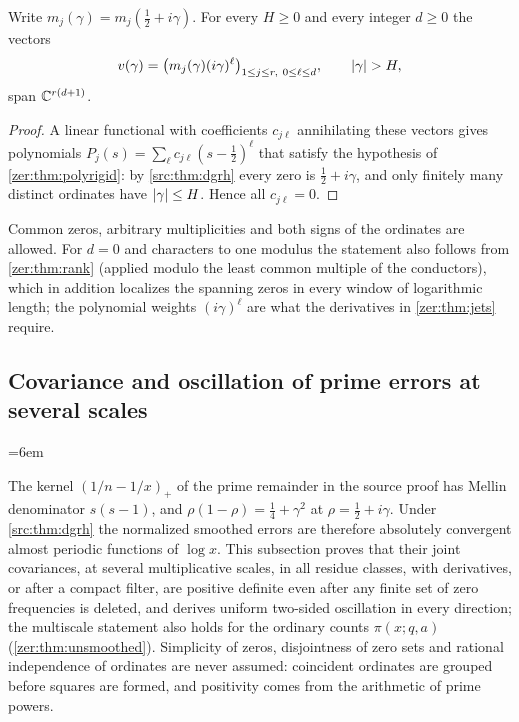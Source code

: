 \begin{corollary}\label{zer:cor:tail}
Write $m_j(\gamma)=m_j(\tfrac12+i\gamma)$. For every $H\ge0$ and every integer $d\ge0$ the
vectors
\[
 v(\gamma)=\bigl(m_j(\gamma)(i\gamma)^\ell\bigr)_{1\le j\le r,\ 0\le\ell\le d},\qquad
 \lvert\gamma\rvert>H,
\]
span $\mathbb{C}^{r(d+1)}$.
\end{corollary}
\begin{proof}
A linear functional with coefficients $c_{j\ell}$ annihilating these vectors gives polynomials
$P_j(s)=\sum_\ell c_{j\ell}(s-\tfrac12)^\ell$ that satisfy the hypothesis of
\cref{zer:thm:polyrigid}: by \cref{src:thm:dgrh} every zero is $\tfrac12+i\gamma$, and only
finitely many distinct ordinates have $\lvert\gamma\rvert\le H$. Hence all $c_{j\ell}=0$.
\end{proof}

Common zeros, arbitrary multiplicities and both signs of the ordinates are allowed. For $d=0$
and characters to one modulus the statement also follows from \cref{zer:thm:rank} (applied
modulo the least common multiple of the conductors), which in addition localizes the spanning
zeros in every window of logarithmic length; the polynomial weights $(i\gamma)^\ell$ are what
the derivatives in \cref{zer:thm:jets} require.

\subsection{Covariance and oscillation of prime errors at several scales}\label{zer:sec:cov}
{\emergencystretch=6em}

The kernel $(1/n-1/x)_+$ of the prime remainder in the source proof has Mellin denominator
$s(s-1)$, and $\rho(1-\rho)=\tfrac14+\gamma^2$ at $\rho=\tfrac12+i\gamma$. Under
\cref{src:thm:dgrh} the normalized smoothed errors are therefore absolutely convergent
almost periodic functions of $\log x$. This subsection proves that their joint covariances,
at several multiplicative scales, in all residue classes, with derivatives, or after a
compact filter, are positive definite even after any finite set of zero frequencies is
deleted, and derives uniform two-sided oscillation in every direction; the multiscale statement
also holds for the ordinary counts $\pi(x;q,a)$ (\cref{zer:thm:unsmoothed}). Simplicity of zeros,
disjointness of zero sets and rational independence of ordinates are never assumed:
coincident ordinates are grouped before squares are formed, and positivity comes from the
arithmetic of prime powers.

